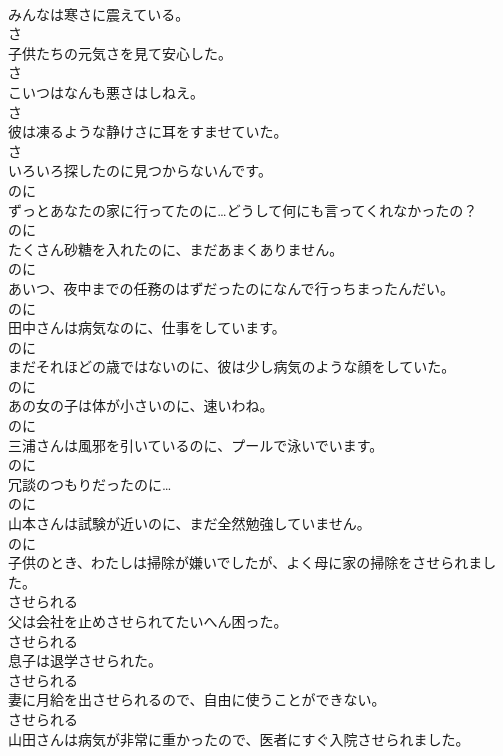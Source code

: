 \documentclass[8pt]{extreport}
\begin{document}
\begin{CJK}{UTF8}{min}
\\	みんなは寒さに震えている。	
\\	さ	
\\	子供たちの元気さを見て安心した。	
\\	さ	
\\	こいつはなんも悪さはしねえ。	
\\	さ	
\\	彼は凍るような静けさに耳をすませていた。	
\\	さ	
\\	いろいろ探したのに見つからないんです。	
\\	のに	
\\	ずっとあなたの家に行ってたのに…どうして何にも言ってくれなかったの？	
\\	のに	
\\	たくさん砂糖を入れたのに、まだあまくありません。	
\\	のに	
\\	あいつ、夜中までの任務のはずだったのになんで行っちまったんだい。	
\\	のに	
\\	田中さんは病気なのに、仕事をしています。	
\\	のに	
\\	まだそれほどの歳ではないのに、彼は少し病気のような顔をしていた。	
\\	のに	
\\	あの女の子は体が小さいのに、速いわね。	
\\	のに	
\\	三浦さんは風邪を引いているのに、プールで泳いでいます。	
\\	のに	
\\	冗談のつもりだったのに…	
\\	のに	
\\	山本さんは試験が近いのに、まだ全然勉強していません。	
\\	のに	
\\	子供のとき、わたしは掃除が嫌いでしたが、よく母に家の掃除をさせられました。	
\\	させられる	
\\	父は会社を止めさせられてたいへん困った。	
\\	させられる	
\\	息子は退学させられた。	
\\	させられる	
\\	妻に月給を出させられるので、自由に使うことができない。	
\\	させられる	
\\	山田さんは病気が非常に重かったので、医者にすぐ入院させられました。	

\end{CJK}
\end{document}

